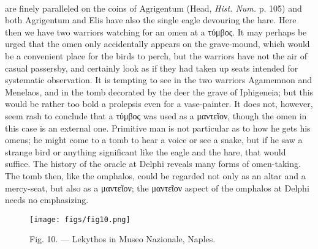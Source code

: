 \documentclass[a4paper, 11pt, oneside, polutonikogreek, english]{article}
\begin{document}
\paragraph{}
are finely paralleled on the coins of Agrigentum (Head, \emph{Hist. Num.} p. 105) and both Agrigentum and Elis have also the single eagle devouring the hare. Here then we have two warriors watching for an omen at a τύμβος. It may perhaps be urged that the omen only accidentally appears on the grave-mound, which would be a convenient place for the birds to perch, but the warriors have not the air of casual passersby, and certainly look as if they had taken up seats intended for systematic observation. It is tempting to see in the two warriors Agamemnon and Menelaos, and in the tomb decorated by the deer the grave of Iphigeneia; but this would be rather too bold a prolepsis even for a vase-painter. It does not, however, seem rash to conclude that a τύμβος was used as a μαντεῖον, though the omen in this case is an external one. Primitive man is not particular as to how he gets his omens; he might come to a tomb to hear a voice or see a snake, but if he saw a strange bird or anything significant like the eagle and the hare, that would suffice. The history of the oracle at Delphi reveals many forms of omen-taking. The tomb then, like the omphalos, could be regarded not only as an altar and a mercy-seat, but also as a μαντεῖον; the μαντεῖον aspect of the omphalos at Delphi needs no emphasizing.
\begin{figure}[H]
\centering
\texttt{[image: figs/fig10.png]}
\caption{Fig. 10. --- Lekythos in Museo Nazionale, Naples.}
\end{figure}
\end{document}
